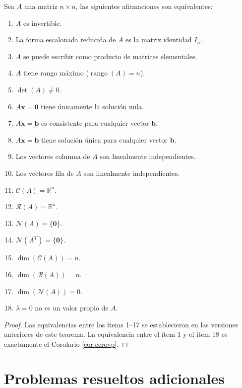 \begin{theorem}
Sea $A$ una matriz $n\times n$, las siguientes afirmaciones son equivalentes: \begin{enumerate}
    \item $A$ es invertible.
    \item La forma escalonada reducida de $A$ es la matriz identidad $I_n$.
    \item $A$ se puede escribir como producto de matrices elementales.
    \item $A$ tiene rango máximo ($\operatorname{rango}(A) = n$).
    \item $\det(A) \neq 0$.
    \item $A\mathbf{x}=\mathbf{0}$ tiene únicamente la solución nula.
    \item $A\mathbf{x}=\mathbf{b}$ es consistente para cualquier vector $\mathbf{b}$.
    \item $A\mathbf{x}=\mathbf{b}$ tiene solución única para cualquier vector $\mathbf{b}$.
    \item Los vectores columna de $A$ son linealmente independientes.
    \item Los vectores fila de $A$ son linealmente independientes.
    \item $\mathcal{C}(A) = \mathbb{R}^n$.
    \item $\mathcal{R}(A) = \mathbb{R}^n$.
    \item $\mathcal{N}(A) = \{\mathbf{0}\}$.
    \item $\mathcal{N}(A^T) = \{\mathbf{0}\}$.
    \item $\dim(\mathcal{C}(A)) = n$.
    \item $\dim(\mathcal{R}(A)) = n$.
    \item $\dim(\mathcal{N}(A)) = 0$.
    \item $\lambda=0$ no es un valor propio de $A.$
\end{enumerate}
\begin{proof}
Las equivalencias entre los ítems 1--17 se establecieron en las versiones anteriores de este teorema. La equivalencia entre el ítem 1 y el ítem 18 es exactamente el Corolario \ref{cor:cerovp}.
\end{proof}
\end{theorem}


\section{Problemas resueltos adicionales}

